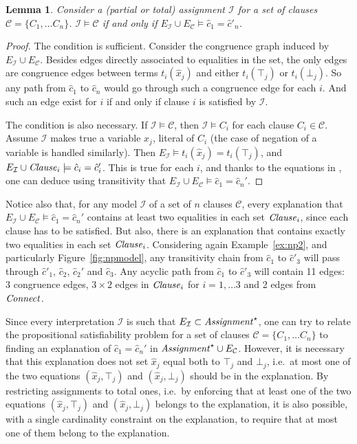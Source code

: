 \documentclass{easychair}
\newtheorem{lemma}{Lemma}
\begin{document}
\begin{lemma}
\label{lemma:eqv}
Consider a (partial or total) assignment $\mathcal{I}$ for a set of clauses
$\mathcal{C}= \{C_1, \dots C_n\}$.  $\mathcal{I} \models \mathcal{C}$ if and only if
$E_{\mathcal{I}} \cup E_\mathcal{C} \models \hat{c}_1 = \hat{c}'_n$.
\end{lemma}
\begin{proof}
The condition is sufficient.  Consider the congruence graph induced by
$E_{\mathcal{I}} \cup E_\mathcal{C}$.  Besides edges directly associated to
equalities in the set, the only edges are congruence edges between terms
$t_i(\hat{x}_j)$ and either $t_i(\top_j)$ or $t_i(\bot_j)$.  So any path from
$\hat{c}_1$ to $\hat{c}_n$ would go through such a congruence edge for each $i$.
And such an edge exist for $i$ if and only if clause $i$ is satisfied by
$\mathcal{I}$.

The condition is also necessary.  If $\mathcal{I} \models \mathcal{C}$, then
$\mathcal{I} \models C_i$ for each clause $C_i \in \mathcal{C}$.  Assume
$\mathcal{I}$ makes true a variable $x_j$, literal of $C_i$ (the case of
negation of a variable is handled similarly).  Then $E_{\mathcal{I}} \models
t_i(\hat{x}_j) = t_i(\top_j)$, and $E_{\mathcal{I}} \cup {\it Clause}_i
\models \hat{c}_i = \hat{c}_i'$.  This is true for each $i$, and
thanks to the equations in \Connect, one can deduce using transitivity that
$E_{\mathcal{I}} \cup E_\mathcal{C} \models \hat{c}_1 = \hat{c}_n'$.
\end{proof}

\noindent Notice also that, for any model $\mathcal{I}$ of a set of $n$ clauses
$\mathcal{C}$, every explanation that $E_{\mathcal{I}} \cup E_\mathcal{C}
\models \hat{c}_1 = \hat{c}_n'$ contains at least two equalities in
each set ${\it Clause}_i$, since each clause has to be satisfied.  But also, there is
an explanation that contains exactly two equalities in each set ${\it Clause}_i$.
Considering again Example~\ref{ex:np2}, and particularly
Figure~\ref{fig:npmodel}, any transitivity chain from $\hat{c}_1$ to
$\hat{c}'_3$ will pass through $\hat{c}'_1$, $\hat{c}_2$, $\hat{c}_2'$ and
$\hat{c}_3$.  Any acyclic path from $\hat{c}_1$ to $\hat{c}'_3$ will contain 11
edges: 3 congruence edges, $3\times 2$ edges in ${\it Clause}_i$ for $i=1,\dots 3$
and 2 edges from ${\it Connect}$.

Since every interpretation $\mathcal{I}$ is such that $E_{\mathcal{I}} \subset
{\it Assignment}^\star$, one can try to relate the propositional satisfiability
problem for a set of clauses $\mathcal{C}= \{C_1, \dots C_n\}$ to finding an
explanation of $\hat{c}_1 = \hat{c}_n'$ in ${\it Assignment}^\star \cup
E_{\mathcal{C}}$.  However, it is necessary that this explanation does not set
$\hat{x}_j$ equal both to $\top_j$ and $\bot_j$, i.e.\ at most one of the two
equations $(\hat{x}_j,\top_j)$ and $(\hat{x}_j,\bot_j)$ should be in the
explanation.  By restricting assignments to total ones, i.e.\ by enforcing that
at least one of the two equations $(\hat{x}_j,\top_j)$ and $(\hat{x}_j,\bot_j)$
belongs to the explanation, it is also possible, with a single cardinality
constraint on the explanation, to require that at most one of them belong to the
explanation.
\end{document}
